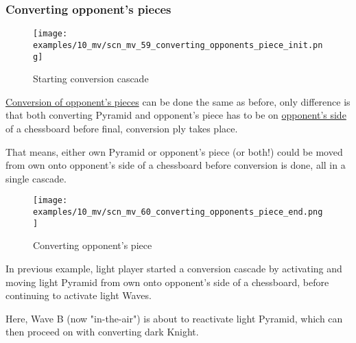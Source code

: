 \subsubsection*{Converting opponent's pieces}
\label{sec:Miranda's veil/Wave/Cascading Waves/Converting opponent's pieces}

\vspace*{-1.4\baselineskip}
\noindent
\begin{figure}[h]
\texttt{[image: examples/10\_mv/scn\_mv\_59\_converting\_opponents\_piece\_init.png]}
\vspace*{-1.3\baselineskip}
\caption{Starting conversion cascade}
\label{fig:scn_mv_59_converting_opponents_piece_init}
\end{figure}

\vspace*{-0.4\baselineskip}
\hyperref[sec:Mayan Ascendancy/Pyramid/Conversion]{Conversion of opponent's pieces}
can be done the same as before, only difference is that both converting Pyramid
and opponent's piece has to be on
\hyperref[sec:Definitions/Chessboard sides, navigation]{opponent's side} of a
chessboard before final, conversion ply takes place.

That means, either own Pyramid or opponent's piece (or both!) could be moved from
own onto opponent's side of a chessboard before conversion is done, all in a single
cascade.

\clearpage %

\vspace*{-2.1\baselineskip}
\noindent
\begin{figure}[h]
\texttt{[image: examples/10\_mv/scn\_mv\_60\_converting\_opponents\_piece\_end.png]}
\vspace*{-1.3\baselineskip}
\caption{Converting opponent's piece}
\label{fig:scn_mv_60_converting_opponents_piece_end}
\end{figure}

\vspace*{-0.4\baselineskip}
In previous example, light player started a conversion cascade by activating and
moving light Pyramid from own onto opponent's side of a chessboard, before
continuing to activate light Waves.

Here, Wave B (now "in-the-air") is about to reactivate light Pyramid, which can
then proceed on with converting dark Knight.

